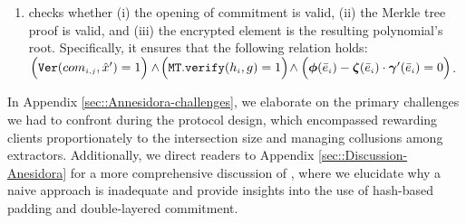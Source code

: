 \begin{enumerate}[leftmargin=4mm]
\begin{enumerate}
 \item\label{e-psi::SC-verification--check-three-vals} checks whether (i) the opening of commitment is valid,  (ii) the Merkle tree proof is valid, and (iii) the encrypted element is the resulting polynomial's root. Specifically, it ensures that the following relation holds: $\Big(\mathtt{Ver}(com_{\scriptscriptstyle i,j}, \hat{x}')=1\Big) \hspace{0mm} \wedge \hspace{-0.5mm} \Big(\mathtt{MT.verify}(h_{\scriptscriptstyle i},g)=1\Big) \hspace{-.5mm} \wedge \hspace{0mm}  \Big(\bm\phi( \bar{e}_{\scriptscriptstyle i})-\bm\zeta( \bar{e}_{\scriptscriptstyle i})\cdot \bm\gamma'( \bar{e}_{\scriptscriptstyle i})=0\Big)$.




\end{enumerate}




\end{enumerate}


 \vspace{-2.5mm}
 In Appendix \ref{sec::Annesidora-challenges}, we elaborate on the primary challenges we had to confront during the protocol design, which encompassed rewarding clients proportionately to the intersection size and managing collusions among extractors. Additionally, we direct readers to Appendix \ref{sec::Discussion-Anesidora} for a more comprehensive discussion of \withRew, where we elucidate why a naive approach is inadequate and provide insights into the use of hash-based padding and double-layered commitment.
 
